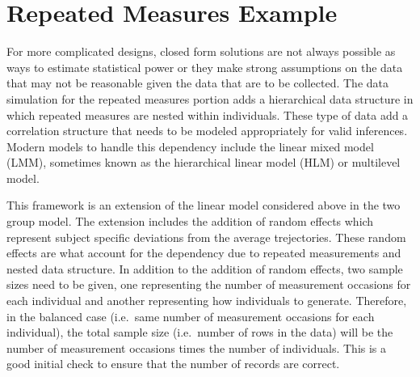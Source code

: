 \documentclass[man]{apa6}
\begin{document}
\hypertarget{repeated-measures-example}{%
\section{Repeated Measures Example}\label{repeated-measures-example}}

For more complicated designs, closed form solutions are not always possible as ways to estimate statistical power or they make strong assumptions on the data that may not be reasonable given the data that are to be collected. The data simulation for the repeated measures portion adds a hierarchical data structure in which repeated measures are nested within individuals. These type of data add a correlation structure that needs to be modeled appropriately for valid inferences. Modern models to handle this dependency include the linear mixed model (LMM), sometimes known as the hierarchical linear model (HLM) or multilevel model.

This framework is an extension of the linear model considered above in the two group model. The extension includes the addition of random effects which represent subject specific deviations from the average trejectories. These random effects are what account for the dependency due to repeated measurements and nested data structure. In addition to the addition of random effects, two sample sizes need to be given, one representing the number of measurement occasions for each individual and another representing how individuals to generate. Therefore, in the balanced case (i.e.~same number of measurement occasions for each individual), the total sample size (i.e.~number of rows in the data) will be the number of measurement occasions times the number of individuals. This is a good initial check to ensure that the number of records are correct.
\end{document}
